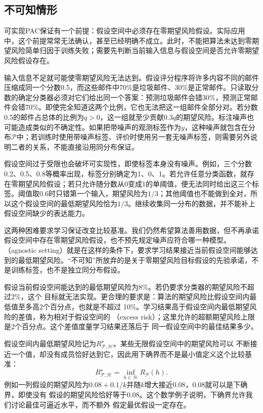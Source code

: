 \subsection{不可知情形}

可实现PAC保证有一个前提：假设空间中必须存在零期望风险假设。实际应用中，这个前提常常无法确认，甚至已经明确不成立。此时，不能把算法未达到零期望风险简单归因于训练失败；需要先判断当前输入信息与假设空间是否允许零期望风险假设存在。

输入信息不足就可能使零期望风险无法达到。假设评分程序将许多内容不同的邮件压缩成同一个分数0.5，而这些邮件中70\%是垃圾邮件、30\%是正常邮件。只读取分数的确定分类器必须对它们给出同一个答案：预测垃圾邮件会错30\%，预测正常邮件会错70\%。即使完全知道这两个比例，它也无法把这一组邮件全部分对。若分数0.5的邮件占总体的比例为$q>0$，这一组就至少贡献$0.3q$的期望风险。标注噪声也可能造成类似的不确定性。如果把带噪声的观测标签作为$y$，这种噪声就包含在分布$\mathcal P$中；若训练时使用带噪声标签、评价时使用另一套无噪声标签，则需要另外说明二者的关系，不能直接沿用同分布保证。

假设空间过于受限也会破坏可实现性，即使标签本身没有噪声。例如，三个分数0.2、0.5、0.8等概率出现，标签分别确定为1、0、1。若允许任意分类函数，就存在零期望风险假设；若只允许随分数从0变成1的单阈值，便无法同时给出这三个标签。阈值取0.6时只错第一个输入，期望风险为$1/3$；其他阈值也不能做到全对，所以这个假设空间的最低期望风险恰为$1/3$。继续收集同一分布的数据，并不能补上假设空间缺少的表达能力。

这两种困难要求学习保证改变比较基准。我们仍然希望算法善用数据，但不再承诺假设空间中存在零期望风险假设，也不预先规定噪声应符合哪一种模型。（agnostic setting）就是在这样的条件下，要求学习结果接近当前假设空间能够达到的最低期望风险。“不可知”所放弃的是关于零期望风险目标假设的先验承诺，不是训练标签，也不是独立同分布假设。

假设当前假设空间能达到的最低期望风险为8\%。若仍要求分类器的期望风险不超过2\%，这个
目标就无法实现。更合理的要求是：算法的期望风险比假设空间内最低值至多高2个百分点，也就是不超过
10\%。学习结果高于假设空间内最低期望风险的差值，称为相对于假设空间的
（excess risk）；这里允许的超额期望风险上限是2个百分点。这个差值度量学习结果还落后于
同一假设空间中的最佳结果多少。

假设空间内最低期望风险记为$R_{\mathcal P,\mathcal H}^\star$。某些无限假设空间中的期望风险可以
不断接近一个值，却没有成员恰好达到它，因此用下确界而不是最小值定义这个比较基准：
\begin{equation}
 R_{\mathcal P,\mathcal H}^\star=\inf_{h\in\mathcal H}R_{\mathcal P}(h).
 \label{eq:best-in-class-risk}
\end{equation}
例如一列假设的期望风险为$0.08+0.1/k$并随$k$增大接近0.08，0.08就可以是下确界，即使没有
假设的期望风险恰好等于0.08。这个数学例子说明，下确界允许我们讨论最佳可逼近水平，而不额外
假定最优假设一定存在。

